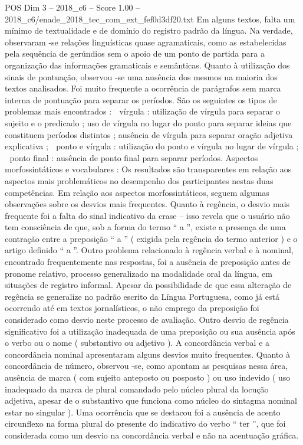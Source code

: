 \begin{textsample}{POS Dim 3 – 2018\_c6 – Score 1.00 – 2018\_c6/enade\_2018\_tec\_com\_ext\_fef0d3df20.txt}
Em alguns textos, falta um mínimo de textualidade e de domínio do registro padrão da língua.
Na verdade, observaram -se relações linguísticas quase agramaticais, como as estabelecidas pela sequência de gerúndios sem o apoio de um ponto de partida para a organização das informações gramaticais e semânticas.
Quanto à utilização dos sinais de pontuação, observou -se uma ausência dos mesmos na maioria dos textos analisados.
Foi muito frequente a ocorrência de parágrafos sem marca interna de pontuação para separar os períodos.
São os seguintes os tipos de problemas mais encontrados :  vírgula : utilização de vírgula para separar o sujeito e o predicado ; uso de vírgula no lugar do ponto para separar ideias que constituem períodos distintos ; ausência de vírgula para separar oração adjetiva explicativa ;  ponto e vírgula : utilização do ponto e vírgula no lugar de vírgula ;  ponto final : ausência de ponto final para separar períodos.
Aspectos morfossintáticos e vocabulares : Os resultados são transparentes em relação aos aspectos mais problemáticos no desempenho dos participantes nestas duas competências.
Em relação aos aspectos morfossintáticos, seguem algumas observações sobre os desvios mais frequentes.
Quanto à regência, o desvio mais frequente foi a falta do sinal indicativo da crase – isso revela que o usuário não tem consciência de que, sob a forma do termo “ a ”, existe a presença de uma contração entre a preposição “ a ” ( exigida pela regência do termo anterior ) e o artigo definido “ a ”.
Outro problema relacionado à regência verbal e à nominal, encontrado frequentemente nas respostas, foi a ausência de preposição antes de pronome relativo, processo generalizado na modalidade oral da língua, em situações de registro informal.
Apesar da possibilidade de que essa alteração de regência se generalize no padrão escrito da Língua Portuguesa, como já está ocorrendo até em textos jornalísticos, o não emprego da preposição foi considerado como desvio neste processo de avaliação.
Outro desvio de regência significativo foi a utilização inadequada de uma preposição ou sua ausência após o verbo ou o nome ( substantivo ou adjetivo ).
A concordância verbal e a concordância nominal apresentaram alguns desvios muito frequentes.
Quanto à concordância de número, observou -se, como apontam as pesquisas nessa área, ausência de marca ( com sujeito anteposto ou posposto ) ou uso indevido ( uso inadequado da marca de plural comandado pelo núcleo plural da locução adjetiva, apesar de o substantivo que funciona como núcleo do sintagma nominal estar no singular ).
Uma ocorrência que se destacou foi a ausência de acento circunflexo na forma plural do presente do indicativo do verbo “ ter ”, que foi considerada como um desvio na concordância verbal e não na acentuação gráfica.

\end{textsample}
